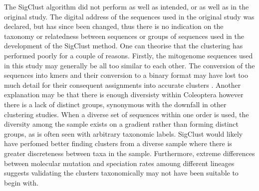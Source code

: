 \documentclass[12pt]{article}
\begin{document}
  The SigClust algorithm did not perform as well as intended, or as well as in the original study. The digital address of the sequences used in the original study was declared, but has since been changed, thus there is no indication on the taxonomy or relatedness between sequences or groups of sequences used in the development of the SigClust method. One can theorise that the clustering has performed poorly for a couple of reasons. Firstly, the mitogenome sequences used in this study may generally be all too similar to each other. The conversion of the sequences into kmers and their conversion to a binary format may have lost too much detail for their consequent assignments into accurate clusters \cite{Chappell2017}. Another explanation may be that there is enough diversisty within Coleoptera however there is a lack of distinct groups, synonymous with the downfall in other clustering studies. When a diverse set of sequences within one order is used, the diversity among the sample exists on a gradient rather than forming distinct groups, as is often seen with arbitrary taxonomic labels. SigClust would likely have perfomed better finding clusters from a diverse sample where there is greater discreteness between taxa in the sample. Furthermore, extreme differences between molecular mutation and speciation rates amoung different lineages suggests validating the clusters taxonomically may not have been suitable to begin with.
\end{document}
